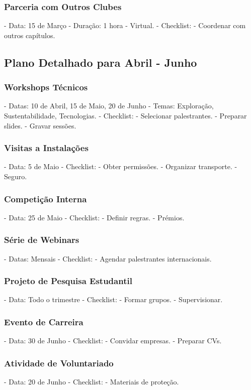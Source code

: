 \documentclass[12pt]{article}
\begin{document}
\subsubsection{Parceria com Outros Clubes}
- Data: 15 de Março
- Duração: 1 hora
- Virtual.
- Checklist:
  - Coordenar com outros capítulos.

\subsection{Plano Detalhado para Abril - Junho}

\subsubsection{Workshops Técnicos}
- Datas: 10 de Abril, 15 de Maio, 20 de Junho
- Temas: Exploração, Sustentabilidade, Tecnologias.
- Checklist:
  - Selecionar palestrantes.
  - Preparar slides.
  - Gravar sessões.

\subsubsection{Visitas a Instalações}
- Data: 5 de Maio
- Checklist:
  - Obter permissões.
  - Organizar transporte.
  - Seguro.

\subsubsection{Competição Interna}
- Data: 25 de Maio
- Checklist:
  - Definir regras.
  - Prémios.

\subsubsection{Série de Webinars}
- Datas: Mensais
- Checklist:
  - Agendar palestrantes internacionais.

\subsubsection{Projeto de Pesquisa Estudantil}
- Data: Todo o trimestre
- Checklist:
  - Formar grupos.
  - Supervisionar.

\subsubsection{Evento de Carreira}
- Data: 30 de Junho
- Checklist:
  - Convidar empresas.
  - Preparar CVs.

\subsubsection{Atividade de Voluntariado}
- Data: 20 de Junho
- Checklist:
  - Materiais de proteção.
\end{document}
